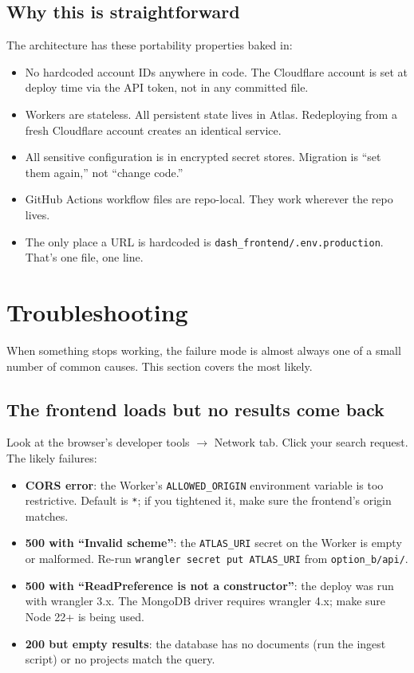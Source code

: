 \documentclass[11pt,a4paper]{article}
\begin{document}
\subsection{Why this is straightforward}

The architecture has these portability properties baked in:

\begin{itemize}[leftmargin=1.5em,itemsep=2pt]
  \item No hardcoded account IDs anywhere in code. The Cloudflare account is set at deploy time via the API token, not in any committed file.
  \item Workers are stateless. All persistent state lives in Atlas. Redeploying from a fresh Cloudflare account creates an identical service.
  \item All sensitive configuration is in encrypted secret stores. Migration is ``set them again,'' not ``change code.''
  \item GitHub Actions workflow files are repo-local. They work wherever the repo lives.
  \item The only place a URL is hardcoded is \texttt{dash\_frontend/.env.production}. That's one file, one line.
\end{itemize}

\section{Troubleshooting}

When something stops working, the failure mode is almost always one of a small number of common causes. This section covers the most likely.

\subsection{The frontend loads but no results come back}

Look at the browser's developer tools \(\rightarrow\) Network tab. Click your search request. The likely failures:

\begin{itemize}[leftmargin=1.5em,itemsep=2pt]
  \item \textbf{CORS error}: the Worker's \texttt{ALLOWED\_ORIGIN} environment variable is too restrictive. Default is \texttt{*}; if you tightened it, make sure the frontend's origin matches.
  \item \textbf{500 with ``Invalid scheme''}: the \texttt{ATLAS\_URI} secret on the Worker is empty or malformed. Re-run \texttt{wrangler secret put ATLAS\_URI} from \texttt{option\_b/api/}.
  \item \textbf{500 with ``ReadPreference is not a constructor''}: the deploy was run with wrangler 3.x. The MongoDB driver requires wrangler 4.x; make sure Node 22+ is being used.
  \item \textbf{200 but empty results}: the database has no documents (run the ingest script) or no projects match the query.
\end{itemize}
\end{document}
